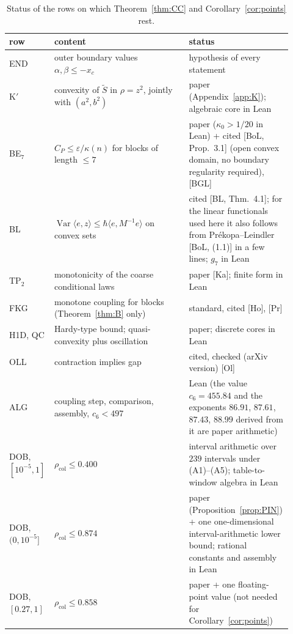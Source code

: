 \documentclass[11pt,a4paper]{article}
\theoremstyle{definition}
\theoremstyle{remark}
\newcommand{\Var}{\operatorname{Var}}
\newcommand{\xc}{x_c}
\newcommand{\rcol}{\rho_{\mathrm{col}}}
\begin{document}
\begin{table}[ht]
\centering\small
\begin{tabular}{@{}p{0.13\linewidth}p{0.47\linewidth}p{0.32\linewidth}@{}}
\toprule
row & content & status\\
\midrule
END & outer boundary values $\alpha,\beta\le-\xc$ & hypothesis of every statement\\
K$'$ & convexity of $\tilde S$ in $\rho=z^2$, jointly with $(a^2,b^2)$ & paper (Appendix~\ref{app:K}); algebraic core in Lean\\
BE$_7$ & $C_P\le\varepsilon/\kappa(n)$ for blocks of length $\le7$ & paper ($\kappa_0>1/20$ in Lean) + cited [BoL, Prop.~3.1] (open convex domain, no boundary regularity required), [BGL]\\
BL & $\Var\langle e,z\rangle\le\hbar\langle e,M^{-1}e\rangle$ on convex sets & cited [BL, Thm.~4.1]; for the linear functionals used here it also follows from Pr\'ekopa--Leindler [BoL, (1.1)] in a few lines; $g_7$ in Lean\\
TP$_2$ & monotonicity of the coarse conditional laws & paper [Ka]; finite form in Lean\\
FKG & monotone coupling for blocks (Theorem~\ref{thm:B} only) & standard, cited [Ho], [Pr]\\
H1D, QC & Hardy-type bound; quasi-convexity plus oscillation & paper; discrete cores in Lean\\
OLL & contraction implies gap & cited, checked (arXiv version) [Ol]\\
ALG & coupling step, comparison, assembly, $c_6<497$ & Lean (the value $c_6=455.84$ and the exponents $86.91$, $87.61$, $87.43$, $88.99$ derived from it are paper arithmetic)\\
DOB, $[10^{-5},1]$ & $\rcol\le0.400$ & interval arithmetic over $239$ intervals under (A1)--(A5); table-to-window algebra in Lean\\
DOB, $(0,10^{-5}]$ & $\rcol\le0.874$ & paper (Proposition~\ref{prop:PIN}) + one one-dimensional interval-arithmetic lower bound; rational constants and assembly in Lean\\
DOB, $[0.27,1]$ & $\rcol\le0.858$ & paper + one floating-point value (not needed for Corollary~\ref{cor:points})\\
\bottomrule
\end{tabular}
\caption{Status of the rows on which Theorem~\ref{thm:CC} and Corollary~\ref{cor:points} rest.}
\label{tab:status}
\end{table}
\end{document}
